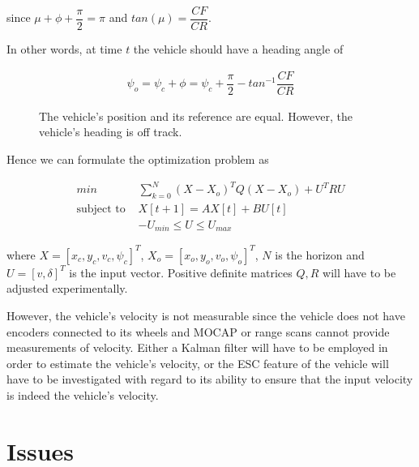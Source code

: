 \documentclass[oneside,12pt]{article}
\begin{document}
    since $\mu + \phi + \dfrac{\pi}{2} = \pi$ and $tan(\mu) = \dfrac{CF}{CR}$.

    In other words, at time $t$ the vehicle should have a heading angle of

    \begin{align}
      \psi_o = \psi_c + \phi = \psi_c + \dfrac{\pi}{2} - tan^{-1}\dfrac{CF}{CR}
    \end{align}


    \begin{figure}[H]\centering
      \scalebox{1}{}
      \caption{The vehicle's position and its reference are equal. However,
        the vehicle's heading is off track.}
      \label{}
    \end{figure}

    Hence we can formulate the optimization problem as

    \begin{align}
      min &\sum\limits_{k=0}^N (X-X_o)^T Q (X-X_o) + U^T R U \\
      \text{subject to } & X[t+1] = A X[t] + B U[t] \\
      & -U_{min} \leq U \leq U_{max}
    \end{align}

    where $X=[x_c, y_c, v_c, \psi_c]^T$, $X_o = [x_o, y_o, v_o, \psi_o]^T$,
    $N$ is the horizon and $U=[v, \delta]^T$ is the input vector.
    Positive definite matrices $Q,R$ will have to be adjusted experimentally.

    However, the vehicle's velocity is not measurable since the vehicle does not
    have encoders connected to its wheels and MOCAP or range scans cannot
    provide measurements of velocity. Either a Kalman filter will have to be
    employed in order to estimate the vehicle's velocity, or the ESC feature of
    the vehicle will have to be investigated with regard to its ability to
    ensure that the input velocity is indeed the vehicle's velocity.



\section{Issues}
\end{document}
